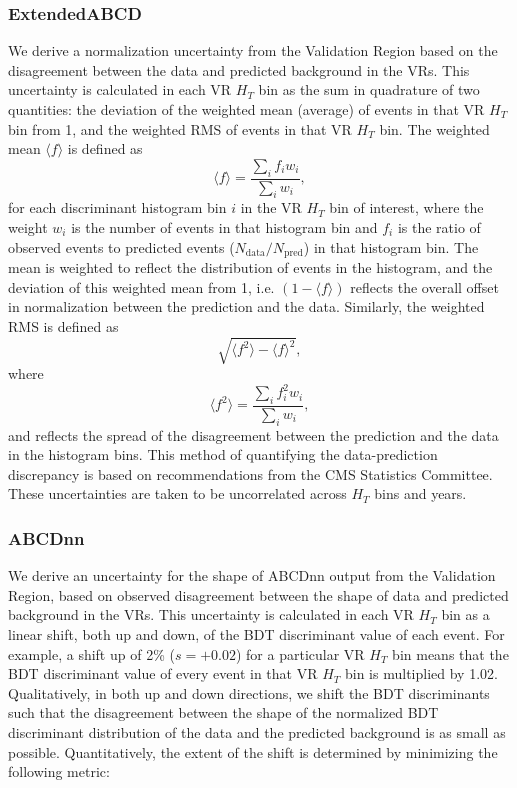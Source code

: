 \documentclass[twoside]{article}
\begin{document}
\subsubsection{ExtendedABCD}
\label{sec:systextendedabcd}
We derive a normalization uncertainty from the Validation Region based on the disagreement between the data and predicted background in the VRs. This uncertainty is calculated in each VR $H_T$ bin as the sum in quadrature of two quantities: the deviation of the weighted mean (average) of events in that VR $H_T$ bin from 1, and the weighted RMS of events in that VR $H_T$ bin. The weighted mean $\langle f \rangle$ is defined as 
\[
\langle f \rangle = \frac{\sum_i f_i w_i}{\sum_i w_i},
\]
for each discriminant histogram bin $i$ in the VR $H_T$ bin of interest, where the weight $w_i$ is the number of events in that histogram bin and $f_i$ is the ratio of observed events to predicted events ($N_{\text{data}} / N_{\text{pred}}$) in that histogram bin. The mean is weighted to reflect the distribution of events in the histogram, and the deviation of this weighted mean from 1, i.e. $(1 - \langle f \rangle)$ reflects the overall offset in normalization between the prediction and the data. Similarly, the weighted RMS is defined as 
\[
\sqrt{\langle f^2 \rangle - \langle f \rangle^2},
\]
where
\[
\langle f^2 \rangle = \frac{\sum_i f^2_i w_i}{\sum_i w_i},
\]
and reflects the spread of the disagreement between the prediction and the data in the histogram bins. This method of quantifying the data-prediction discrepancy is based on recommendations from the CMS Statistics Committee. These uncertainties are taken to be uncorrelated across $H_T$ bins and years.

\subsubsection{ABCDnn}
\label{sec:systabcdnn}
We derive an uncertainty for the shape of ABCDnn output from the Validation Region, based on observed disagreement between the shape of data and predicted background in the VRs. This uncertainty is calculated in each VR $H_T$ bin as a linear shift, both up and down, of the BDT discriminant value of each event. For example, a shift up of 2\% ($s=+0.02$) for a particular VR $H_T$ bin means that the BDT discriminant value of every event in that VR $H_T$ bin is multiplied by 1.02. Qualitatively, in both up and down directions, we shift the BDT discriminants such that the disagreement between the shape of the normalized BDT discriminant distribution of the data and the predicted background is as small as possible. Quantitatively, the extent of the shift is determined by minimizing the following metric:
\end{document}

